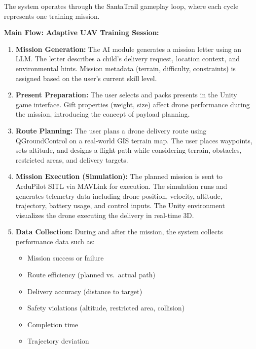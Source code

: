 The system operates through the SantaTrail gameplay loop, where each cycle represents one training mission.

\textbf{Main Flow: Adaptive UAV Training Session:}

\begin{enumerate}
    \item \textbf{Mission Generation:} The AI module generates a mission letter using an LLM. The letter describes a child's delivery request, location context, and environmental hints. Mission metadata (terrain, difficulty, constraints) is assigned based on the user's current skill level.
    
    \item \textbf{Present Preparation:} The user selects and packs presents in the Unity game interface. Gift properties (weight, size) affect drone performance during the mission, introducing the concept of payload planning.
    
    \item \textbf{Route Planning:} The user plans a drone delivery route using QGroundControl on a real-world GIS terrain map. The user places waypoints, sets altitude, and designs a flight path while considering terrain, obstacles, restricted areas, and delivery targets.
    
    \item \textbf{Mission Execution (Simulation):} The planned mission is sent to ArduPilot SITL via MAVLink for execution. The simulation runs and generates telemetry data including drone position, velocity, altitude, trajectory, battery usage, and control inputs. The Unity environment visualizes the drone executing the delivery in real-time 3D.
    
    \item \textbf{Data Collection:} During and after the mission, the system collects performance data such as:
    \begin{itemize}
        \item Mission success or failure
        \item Route efficiency (planned vs.\ actual path)
        \item Delivery accuracy (distance to target)
        \item Safety violations (altitude, restricted area, collision)
        \item Completion time
        \item Trajectory deviation
    \end{itemize}
    

\end{enumerate}
